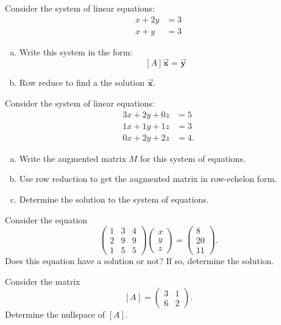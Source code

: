 \documentclass[12pt]{article} %
\begin{document}
\begin{problem} 
Consider the system of linear equations:
\begin{align*}
    x + 2y &= 3\\
    x + y  &= 3
\end{align*}
\begin{enumerate}[(a)]
    \item Write this system in the form:
    \[
    [A]\vec{\boldsymbol{x}} = \vec{\boldsymbol{y}}
    \]
    \item Row reduce to find a the solution $\vec{\boldsymbol{x}}$.
\end{enumerate}
\end{problem}

\begin{problem}
Consider the system of linear equations:
\begin{align*}
    3x+2y+0z&=5\\
    1x+1y+1z&=3\\
    0x+2y+2z&=4.
\end{align*}
\begin{enumerate}[(a)]
    \item Write the augmented matrix $M$ for this system of equations.
    \item Use row reduction to get the augmented matrix in row-echelon form.
    \item Determine the solution to the system of equations.
\end{enumerate}
\end{problem}

\begin{problem}
Consider the equation
\[
\begin{pmatrix} 1 & 3 & 4 \\ 2 & 9 & 9 \\ 1 & 5 & 5 \end{pmatrix} \begin{pmatrix} x \\ y \\ z \end{pmatrix} = \begin{pmatrix} 8 \\ 20 \\ 11 \end{pmatrix}.
\]
Does this equation have a solution or not? If so, determine the solution.
\end{problem}

\begin{problem} 
Consider the matrix
\[
[A] = \begin{pmatrix} 3 & 1 \\ 6 & 2 \end{pmatrix}.
\]
Determine the nullspace of $[A]$.
\end{problem}
\end{document}
